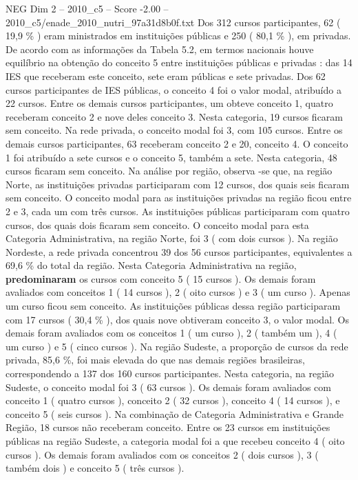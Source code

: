 \begin{textsample}{NEG Dim 2 – 2010\_c5 – Score -2.00 – 2010\_c5/enade\_2010\_nutri\_97a31d8b0f.txt}
Dos 312 cursos participantes, 62 ( 19,9 \% ) eram ministrados em instituições públicas e 250 ( 80,1 \% ), em privadas.
De acordo com as informações da Tabela 5.2, em termos nacionais houve equilíbrio na obtenção do conceito 5 entre instituições públicas e privadas : das 14 IES que receberam este conceito, sete eram públicas e sete privadas.
Dos 62 cursos participantes de IES públicas, o conceito 4 foi o valor modal, atribuído a 22 cursos.
Entre os demais cursos participantes, um obteve conceito 1, quatro receberam conceito 2 e nove deles conceito 3.
Nesta categoria, 19 cursos ficaram sem conceito.
Na rede privada, o conceito modal foi 3, com 105 cursos.
Entre os demais cursos participantes, 63 receberam conceito 2 e 20, conceito 4.
O conceito 1 foi atribuído a sete cursos e o conceito 5, também a sete.
Nesta categoria, 48 cursos ficaram sem conceito.
Na análise por região, observa -se que, na região Norte, as instituições privadas participaram com 12 cursos, dos quais seis ficaram sem conceito.
O conceito modal para as instituições privadas na região ficou entre 2 e 3, cada um com três cursos.
As instituições públicas participaram com quatro cursos, dos quais dois ficaram sem conceito.
O conceito modal para esta Categoria Administrativa, na região Norte, foi 3 ( com dois cursos ).
Na região Nordeste, a rede privada concentrou 39 dos 56 cursos participantes, equivalentes a 69,6 \% do total da região.
Nesta Categoria Administrativa na região, \textbf{predominaram} os cursos com conceito 5 ( 15 cursos ).
Os demais foram avaliados com conceitos 1 ( 14 cursos ), 2 ( oito cursos ) e 3 ( um curso ).
Apenas um curso ficou sem conceito.
As instituições públicas dessa região participaram com 17 cursos ( 30,4 \% ), dos quais nove obtiveram conceito 3, o valor modal.
Os demais foram avaliados com os conceitos 1 ( um curso ), 2 ( também um ), 4 ( um curso ) e 5 ( cinco cursos ).
Na região Sudeste, a proporção de cursos da rede privada, 85,6 \%, foi mais elevada do que nas demais regiões brasileiras, correspondendo a 137 dos 160 cursos participantes.
Nesta categoria, na região Sudeste, o conceito modal foi 3 ( 63 cursos ).
Os demais foram avaliados com conceito 1 ( quatro cursos ), conceito 2 ( 32 cursos ), conceito 4 ( 14 cursos ), e conceito 5 ( seis cursos ).
Na combinação de Categoria Administrativa e Grande Região, 18 cursos não receberam conceito.
Entre os 23 cursos em instituições públicas na região Sudeste, a categoria modal foi a que recebeu conceito 4 ( oito cursos ).
Os demais foram avaliados com os conceitos 2 ( dois cursos ), 3 ( também dois ) e conceito 5 ( três cursos ).

\end{textsample}

